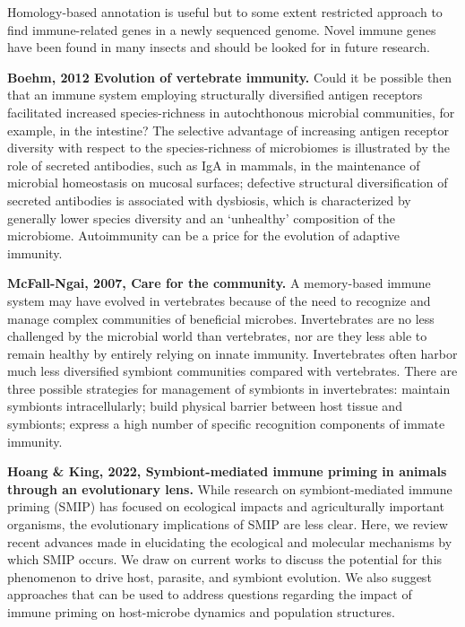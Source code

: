 \documentclass[11pt]{article}
\begin{document}
\begin{sloppypar}
Homology-based annotation is useful but to some extent restricted approach to find immune-related genes in a newly sequenced genome. 
Novel immune genes have been found in many insects and should be looked for in future research.
\par
\textbf{Boehm, 2012 Evolution of vertebrate immunity.} \newline
Could it be possible then that an immune system employing structurally diversified antigen receptors facilitated increased species-richness in autochthonous microbial communities, for example, in the intestine? 
The selective advantage of increasing antigen receptor diversity with respect to the species-richness of microbiomes is illustrated by the role of secreted antibodies, such as IgA in mammals, in the maintenance of microbial homeostasis on mucosal surfaces; defective structural diversification of secreted antibodies is associated with dysbiosis, which is characterized by generally lower species diversity and an ‘unhealthy’ composition of the microbiome. 
Autoimmunity can be a price for the evolution of adaptive immunity. 
\par
\textbf{McFall-Ngai, 2007, Care for the community.} \newline
A memory-based immune system may have evolved in vertebrates because of the need to recognize and manage complex communities of beneficial microbes. 
Invertebrates are no less challenged by the microbial world than vertebrates, nor are they less able to remain healthy by entirely relying on innate immunity. 
Invertebrates often harbor much less diversified symbiont communities compared with vertebrates. 
There are three possible strategies for management of symbionts in invertebrates: 
maintain symbionts intracellularly; 
build physical barrier between host tissue and symbionts; 
express a high number of specific recognition components of immate immunity. 
\par
\textbf{Hoang & King, 2022, Symbiont-mediated immune priming in animals through an evolutionary lens.} \newline
While research on symbiont-mediated immune priming (SMIP) has focused on ecological impacts and agriculturally important organisms, the evolutionary implications of SMIP are less clear. 
Here, we review recent advances made in elucidating the ecological and molecular mechanisms by which SMIP occurs. 
We draw on current works to discuss the potential for this phenomenon to drive host, parasite, and symbiont evolution. 
We also suggest approaches that can be used to address questions regarding the impact of immune priming on host-microbe dynamics and population structures. 

\end{sloppypar}
\end{document}
